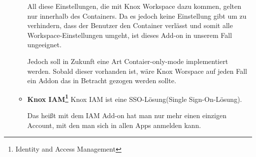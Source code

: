\begin{itemize}
\begin{itemize}
\begin{itemize}
		\end{itemize}
	All diese Einstellungen, die mit Knox Workspace dazu kommen, gelten nur innerhalb des Containers. Da es jedoch keine Einstellung gibt um zu verhindern, dass der Benutzer den Container verlässt und somit alle Workspace-Einstellungen umgeht, ist dieses Add-on in unserem Fall ungeeignet. \par Jedoch soll in Zukunft eine Art Contaier-only-mode implementiert werden. Sobald dieser vorhanden ist, wäre Knox Worspace auf jeden Fall ein Addon das in Betracht gezogen werden sollte.
		\item \textbf{Knox IAM\footnote{Identity and Access Management}} \newline
		Knox IAM ist eine SSO-Lösung(Single Sign-On-Lösung). \par Das heißt mit dem IAM Add-on hat man nur mehr einen einzigen Account, mit den man sich in allen Apps anmelden kann.
	\end{itemize}
\end{itemize}
